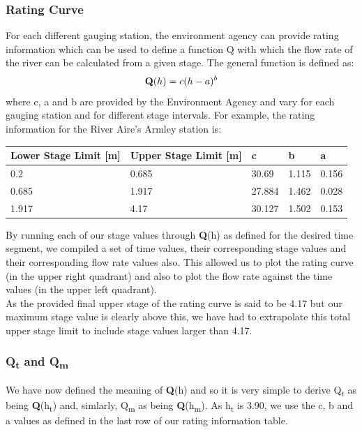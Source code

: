 \documentclass[11 pt, a4paper]{article}
\begin{document}
\subsubsection{Rating Curve}
For each different gauging station, the environment agency can provide rating information which can be used to define a function Q with which the flow rate of the river can be calculated from a given stage. The general function is defined as:
\[{\bf Q}(h)=c(h-a)^b\]
where c, a and b are provided by the Environment Agency and vary for each gauging station and for different stage intervals. For example, the rating information for the River Aire's Armley station is:
\begin{center}
\begin{tabular}{|l|l|l|l|l|}
\hline
Lower Stage Limit {[}m{]} & Upper Stage Limit {[}m{]} & c & b & a \\
\hline
0.2 & 0.685 & 30.69 & 1.115 & 0.156 \\
0.685 & 1.917 & 27.884 & 1.462 & 0.028 \\
1.917 & 4.17 & 30.127 & 1.502 & 0.153 \\
\hline
\end{tabular}
\end{center}
By running each of our stage values through {\bf Q}(h) as defined for the desired time segment, we compiled a set of time values, their corresponding stage values and their corresponding flow rate values also. This allowed us to plot the rating curve (in the upper right quadrant) and also to plot the flow rate against the time values (in the upper left quadrant). \\
As the provided final upper stage of the rating curve is said to be 4.17 but our maximum stage value is clearly above this, we have had to extrapolate this total upper stage limit to include stage values larger than 4.17.

\subsubsection{Q\textsubscript{t} and Q\textsubscript{m}}
We have now defined the meaning of {\bf Q}(h) and so it is very simple to derive Q\textsubscript{t} as being {\bf Q}(h\textsubscript{t}) and, simlarly, Q\textsubscript{m} as being {\bf Q}(h\textsubscript{m}). As h\textsubscript{t} is 3.90, we use the c, b and a values as defined in the last row of our rating information table.
\end{document}
